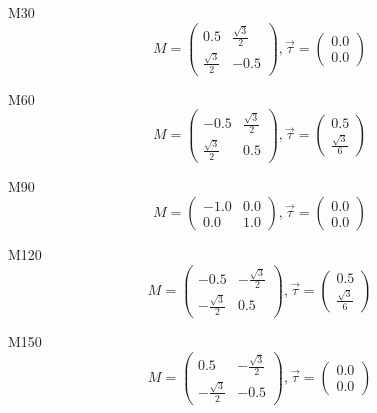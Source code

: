\documentclass[12pt, fleqn]{article}
\begin{document}
M30
\begin{equation}
    M=
    \begin{pmatrix}
        0.5&\frac{\sqrt{3}}{2}\\
        \frac{\sqrt{3}}{2}&-0.5
    \end{pmatrix}
    ,\vec{\tau}=
    \begin{pmatrix}
        0.0\\
        0.0
    \end{pmatrix}
    \label{M30}
\end{equation}

M60
\begin{equation}
    M=
    \begin{pmatrix}
        -0.5&\frac{\sqrt{3}}{2}\\
        \frac{\sqrt{3}}{2}&0.5
    \end{pmatrix}
    ,\vec{\tau}=
    \begin{pmatrix}
        0.5\\
        \frac{\sqrt{3}}{6}
    \end{pmatrix}
    \label{M60}
\end{equation}

M90
\begin{equation}
    M=
    \begin{pmatrix}
        -1.0&0.0\\
        0.0&1.0
    \end{pmatrix}
    ,\vec{\tau}=
    \begin{pmatrix}
        0.0\\
        0.0
    \end{pmatrix}
    \label{M90}
\end{equation}

M120
\begin{equation}
    M=
    \begin{pmatrix}
        -0.5&-\frac{\sqrt{3}}{2}\\
        -\frac{\sqrt{3}}{2}&0.5
    \end{pmatrix}
    ,\vec{\tau}=
    \begin{pmatrix}
        0.5\\
        \frac{\sqrt{3}}{6}
    \end{pmatrix}
    \label{M120}
\end{equation}

M150
\begin{equation}
    M=
    \begin{pmatrix}
        0.5&-\frac{\sqrt{3}}{2}\\
        -\frac{\sqrt{3}}{2}&-0.5
    \end{pmatrix}
    ,\vec{\tau}=
    \begin{pmatrix}
        0.0\\
        0.0
    \end{pmatrix}
    \label{M150}
\end{equation}
\end{document}
